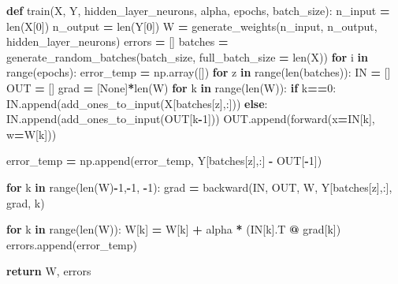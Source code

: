 \documentclass[
]{book}
\newenvironment{Shaded}{\begin{snugshade}}{\end{snugshade}}
\newcommand{\BuiltInTok}[1]{#1}
\newcommand{\ControlFlowTok}[1]{\textcolor[rgb]{0.13,0.29,0.53}{\textbf{#1}}}
\newcommand{\DecValTok}[1]{\textcolor[rgb]{0.00,0.00,0.81}{#1}}
\newcommand{\KeywordTok}[1]{\textcolor[rgb]{0.13,0.29,0.53}{\textbf{#1}}}
\newcommand{\NormalTok}[1]{#1}
\newcommand{\OperatorTok}[1]{\textcolor[rgb]{0.81,0.36,0.00}{\textbf{#1}}}
\newcommand{\VariableTok}[1]{\textcolor[rgb]{0.00,0.00,0.00}{#1}}
\begin{document}
\begin{Shaded}
\begin{Highlighting}[]
\KeywordTok{def}\NormalTok{ train(X, Y, hidden\_layer\_neurons, alpha, epochs, batch\_size):}
\NormalTok{  n\_input }\OperatorTok{=} \BuiltInTok{len}\NormalTok{(X[}\DecValTok{0}\NormalTok{])}
\NormalTok{  n\_output }\OperatorTok{=} \BuiltInTok{len}\NormalTok{(Y[}\DecValTok{0}\NormalTok{])}
\NormalTok{  W }\OperatorTok{=}\NormalTok{ generate\_weights(n\_input, n\_output, hidden\_layer\_neurons)}
\NormalTok{  errors }\OperatorTok{=}\NormalTok{ []}
\NormalTok{  batches }\OperatorTok{=}\NormalTok{ generate\_random\_batches(batch\_size, full\_batch\_size }\OperatorTok{=} \BuiltInTok{len}\NormalTok{(X))}
  \ControlFlowTok{for}\NormalTok{ i }\KeywordTok{in} \BuiltInTok{range}\NormalTok{(epochs):}
\NormalTok{    error\_temp }\OperatorTok{=}\NormalTok{ np.array([])}
    \ControlFlowTok{for}\NormalTok{ z }\KeywordTok{in} \BuiltInTok{range}\NormalTok{(}\BuiltInTok{len}\NormalTok{(batches)):}
\NormalTok{      IN }\OperatorTok{=}\NormalTok{ []}
\NormalTok{      OUT }\OperatorTok{=}\NormalTok{ []}
\NormalTok{      grad }\OperatorTok{=}\NormalTok{ [}\VariableTok{None}\NormalTok{]}\OperatorTok{*}\BuiltInTok{len}\NormalTok{(W)}
      \ControlFlowTok{for}\NormalTok{ k }\KeywordTok{in} \BuiltInTok{range}\NormalTok{(}\BuiltInTok{len}\NormalTok{(W)):}
        \ControlFlowTok{if}\NormalTok{ k}\OperatorTok{==}\DecValTok{0}\NormalTok{:}
\NormalTok{          IN.append(add\_ones\_to\_input(X[batches[z],:]))}
        \ControlFlowTok{else}\NormalTok{:}
\NormalTok{          IN.append(add\_ones\_to\_input(OUT[k}\OperatorTok{{-}}\DecValTok{1}\NormalTok{]))}
\NormalTok{        OUT.append(forward(x}\OperatorTok{=}\NormalTok{IN[k], w}\OperatorTok{=}\NormalTok{W[k]))}
        
\NormalTok{      error\_temp }\OperatorTok{=}\NormalTok{ np.append(error\_temp, Y[batches[z],:] }\OperatorTok{{-}}\NormalTok{ OUT[}\OperatorTok{{-}}\DecValTok{1}\NormalTok{])}
        
      \ControlFlowTok{for}\NormalTok{ k }\KeywordTok{in} \BuiltInTok{range}\NormalTok{(}\BuiltInTok{len}\NormalTok{(W)}\OperatorTok{{-}}\DecValTok{1}\NormalTok{,}\OperatorTok{{-}}\DecValTok{1}\NormalTok{, }\OperatorTok{{-}}\DecValTok{1}\NormalTok{):}
\NormalTok{        grad }\OperatorTok{=}\NormalTok{ backward(IN, OUT, W, Y[batches[z],:], grad, k) }
        
      \ControlFlowTok{for}\NormalTok{ k }\KeywordTok{in} \BuiltInTok{range}\NormalTok{(}\BuiltInTok{len}\NormalTok{(W)):}
\NormalTok{        W[k] }\OperatorTok{=}\NormalTok{ W[k] }\OperatorTok{+}\NormalTok{ alpha }\OperatorTok{*}\NormalTok{ (IN[k].T }\OperatorTok{@}\NormalTok{ grad[k])}
\NormalTok{    errors.append(error\_temp)}
    
  \ControlFlowTok{return}\NormalTok{ W, errors}
\end{Highlighting}
\end{Shaded}
\end{document}

